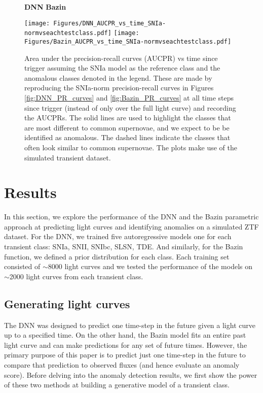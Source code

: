 \documentclass[fleqn,usenatbib]{mnras}
\begin{document}
\begin{figure*}
    \begin{flushleft}
        \hspace{0.25\linewidth} \textbf{DNN} \hspace{0.45\linewidth} \textbf{Bazin}\par\medskip
        \vspace{-1.5em}
    \end{flushleft}
    \centering
    \texttt{[image: Figures/DNN\_AUCPR\_vs\_time\_SNIa-normvseachtestclass.pdf]}
    \texttt{[image: Figures/Bazin\_AUCPR\_vs\_time\_SNIa-normvseachtestclass.pdf]}
    \caption{Area under the precision-recall curves (AUCPR) vs time since trigger assuming the SNIa model as the reference class and the anomalous classes denoted in the legend. These are made by reproducing the SNIa-norm precision-recall curves in Figures \ref{fig:DNN_PR_curves} and \ref{fig:Bazin_PR_curves} at all time steps since trigger (instead of only over the full light curve) and recording the AUCPRs. The solid lines are used to highlight the classes that are most different to common supernovae, and we expect to be be identified as anomalous. The dashed lines indicate the classes that often look similar to common supernovae. The plots make use of the simulated transient dataset.}
    \label{fig:AUCPR_vs_time}
\end{figure*}




\section{Results}
\label{sec:Results}
In this section, we explore the performance of the DNN and the Bazin parametric approach at predicting light curves and identifying anomalies on a simulated ZTF dataset. For the DNN, we trained five autoregressive models one for each transient class: SNIa, SNII, SNIbc, SLSN, TDE. And similarly, for the Bazin function, we defined a prior distribution for each class. Each training set consisted of $\sim$8000 light curves and we tested the performance of the models on $\sim$2000 light curves from each transient class.


\subsection{Generating light curves}
The DNN was designed to predict one time-step in the future given a light curve up to a specified time. On the other hand, the Bazin model fits an entire past light curve and can make predictions for any set of future times. However, the primary purpose of this paper is to predict just one time-step in the future to compare that prediction to observed fluxes (and hence evaluate an anomaly score). Before delving into the anomaly detection results, we first show the power of these two methods at building a generative model of a transient class. 
\end{document}
